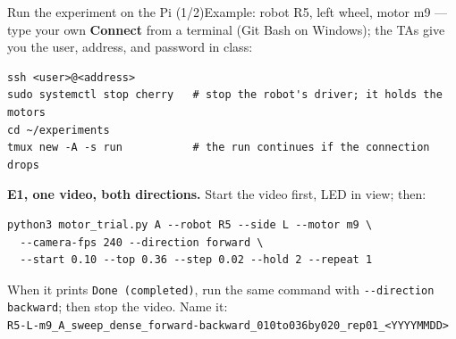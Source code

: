 %
\begin{frame}[fragile]{Run the experiment on the Pi (1/2)}{Example: robot R5, left wheel, motor m9 --- type your own}
  \label{app:pi-e1}
  \scriptsize
  \textbf{Connect} from a terminal (Git Bash on Windows); the TAs give you the user, address, and password in class:
\begin{verbatim}
ssh <user>@<address>
sudo systemctl stop cherry   # stop the robot's driver; it holds the motors
cd ~/experiments
tmux new -A -s run           # the run continues if the connection drops
\end{verbatim}
  \vspace{-4pt}
  \textbf{E1, one video, both directions.} Start the video first, LED in view; then:
\begin{verbatim}
python3 motor_trial.py A --robot R5 --side L --motor m9 \
  --camera-fps 240 --direction forward \
  --start 0.10 --top 0.36 --step 0.02 --hold 2 --repeat 1
\end{verbatim}
  \vspace{-4pt}
  When it prints \texttt{Done (completed)}, run the same command with \verb|--direction backward|; then stop the video. Name it:\\
  \texttt{R5-L-m9\_A\_sweep\_dense\_forward-backward\_010to036by020\_rep01\_<YYYYMMDD>}
\end{frame}
